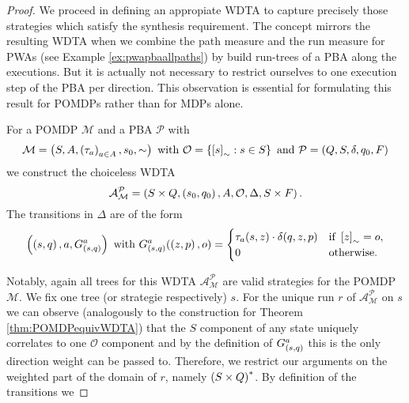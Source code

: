 \begin{proof}
  We proceed in defining an appropiate \ac{WDTA} to capture precisely those 
  strategies which satisfy the synthesis requirement. The concept mirrors the
  resulting \ac{WDTA} when we combine the path measure and the run measure for
  \acp{PWA} (see Example \ref{ex:pwapbaallpaths}) by build run-trees of a 
  \ac{PBA} along the executions. But it is actually not necessary to restrict
  ourselves to one execution step of the \ac{PBA} per direction. This 
  observation is essential for formulating this result for \acp{POMDP} rather 
  than for \acp{MDP} alone.
  \begin{definition}
    For a \ac{POMDP} $\mathcal{M}$ and a \ac{PBA} $\mathcal{P}$ with
    \begin{equation*}
      \mathcal{M} = \left(S, A, \left(\tau_{a}\right)_{a\in A}, s_{0}, \sim\right)
      \text{ with }
      \mathcal{O} = \left\{\left[s\right]_{\sim}: s\in S\right\}
      \text{ and }
      \mathcal{P} = \left(Q, S, \delta, q_{0}, F\right)
    \end{equation*} 
    we construct the choiceless \ac{WDTA}
    \begin{equation*}
      \mathcal{A}_{\mathcal{M}}^{\mathcal{P}} = \left(
        S\times Q, \left(s_{0}, q_{0}\right), A, \mathcal{O}, \Delta, S\times F
      \right).
    \end{equation*}
    The transitions in $\Delta$ are of the form
    \begin{equation*}
      \left(\left(s, q\right), a, G_{\left(s,q\right)}^{a}\right)
      \text{ with }
      G_{\left(s,q\right)}^{a}(\left(z,p\right), o) = \begin{cases}
        \tau_{a}(s, z)\cdot\delta(q, z, p)&\text{if }\left[z\right]_{\sim} = o,\\
        0&\text{otherwise}.
      \end{cases}
    \end{equation*}
  \end{definition}
  Notably, again all trees for this \ac{WDTA} 
  $\mathcal{A}_{\mathcal{M}}^{\mathcal{P}}$ are valid strategies for the 
  \ac{POMDP} $\mathcal{M}$. We fix one tree (or strategie respectively) $s$. 
  For the unique run $r$ of $\mathcal{A}_{\mathcal{M}}^{\mathcal{P}}$ on $s$ we
  can observe (analogously to the construction for Theorem 
  \ref{thm:POMDPequivWDTA}) that the $S$ component of any state uniquely 
  correlates to one $\mathcal{O}$ component and by the definition of 
  $G_{\left(s, q\right)}^{a}$ this is the only direction weight can be passed to.
  Therefore, we restrict our arguments on the weighted part of the domain of
  $r$, namely $\left(S\times Q\right)^{*}$. By definition of the transitions we 

\end{proof}

